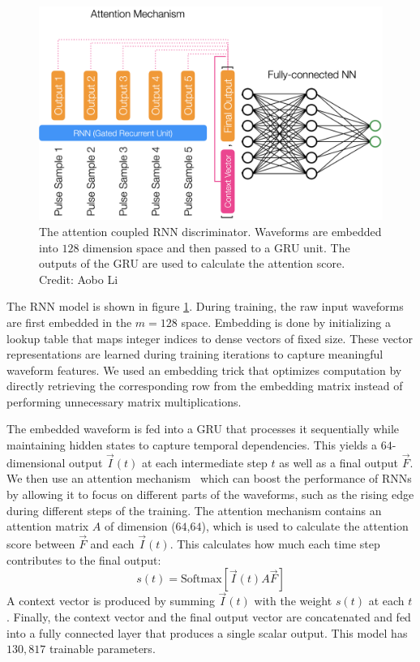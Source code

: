 \begin{figure}[htb!]
    \centering
    \includegraphics[width=0.8\linewidth,trim={0pc 0pc 0pc 0pc},clip]{ch6/figs/rnnAttention.png}
    \caption{The attention coupled RNN discriminator. Waveforms are embedded into $128$ dimension space and then passed to a GRU unit. The outputs of the GRU are used to calculate the attention score. Credit: Aobo Li}
    \label{ch6_fig_detail_network}
\end{figure}

The RNN model is shown in figure \ref{ch6_fig_detail_network}. During training, the raw input waveforms are first embedded in the $m=128$ space. Embedding is done by initializing a lookup table that maps integer indices to dense vectors of fixed size. These vector representations are learned during training iterations to capture meaningful waveform features. We used an embedding trick that optimizes computation by directly retrieving the corresponding row from the embedding matrix instead of performing unnecessary matrix multiplications. 

The embedded waveform is fed into a GRU that processes it sequentially while maintaining hidden states to capture temporal dependencies. This yields a $64$-dimensional output $\vec{I}(t)$ at each intermediate step $t$ as well as a final output $\vec{F}$. We then use an attention mechanism~\cite{attention} which can boost the performance of RNNs by allowing it to focus on different parts of the waveforms, such as the rising edge during different steps of the training. The attention mechanism contains an attention matrix \( A \) of dimension ($64$,$64$), which is used to calculate the attention score between $\vec{F}$ and each $\vec{I}(t)$. This calculates how much each time step contributes to the final output:
\begin{equation}
    s(t) = \mathrm{Softmax}[\vec{I}(t) A \vec{F}]
\end{equation}
A context vector is produced by summing $\vec{I}(t)$ with the weight $s(t)$ at each $t$. Finally, the context vector and the final output vector are concatenated and fed into a fully connected layer that produces a single scalar output. This model has $130,817$ trainable parameters.
